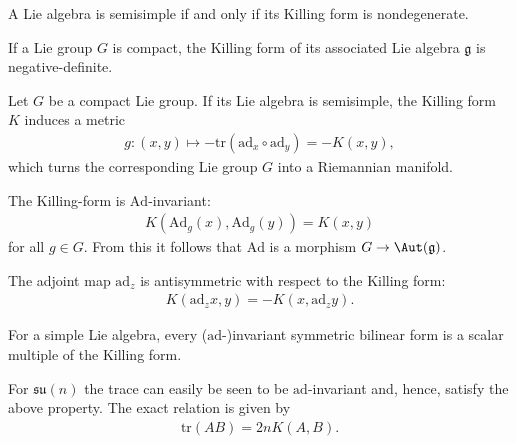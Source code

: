     \begin{theorem}
        A Lie algebra is semisimple if and only if its Killing form is nondegenerate.
    \end{theorem}

    \begin{property}
        If a Lie group $G$ is compact, the Killing form of its associated Lie algebra $\mathfrak{g}$ is negative-definite.
    \end{property}
    \begin{result}
        Let $G$ be a compact Lie group. If its Lie algebra is semisimple, the Killing form $K$ induces a metric
        \begin{gather}
            g:(x,y)\mapsto -\mathrm{tr}(\mathrm{ad}_x\circ\mathrm{ad}_y) = -K(x,y),
        \end{gather}
        which turns the corresponding Lie group $G$ into a Riemannian manifold.
    \end{result}

    \begin{property}
        The Killing-form is $\mathrm{Ad}$-invariant:
        \begin{gather}
            K(\mathrm{Ad}_g(x),\mathrm{Ad}_g(y)) = K(x,y)
        \end{gather}
        for all $g\in G$. From this it follows that $\mathrm{Ad}$ is a morphism $G\rightarrow\Aut(\mathfrak{g})$.
    \end{property}
    \begin{result}
        The adjoint map $\mathrm{ad}_z$ is antisymmetric with respect to the Killing form:
        \begin{gather}
            \label{lie:ad_killing_form}
            K(\mathrm{ad}_zx,y) = -K(x,\mathrm{ad}_zy).
        \end{gather}
    \end{result}

    \begin{property}\label{lie:killing_trace}
        For a simple Lie algebra, every ($\mathrm{ad}$-)invariant symmetric bilinear form is a scalar multiple of the Killing form.
    \end{property}
    \begin{example}
        For $\mathfrak{su}(n)$ the trace can easily be seen to be $\mathrm{ad}$-invariant and, hence, satisfy the above property. The exact relation is given by
        \begin{gather}
            \text{tr}(AB) = 2nK(A,B).
        \end{gather}
    \end{example}

